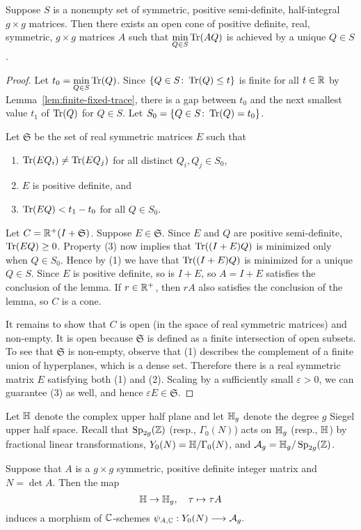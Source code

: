 \documentclass{amsart}
\begin{document}
\begin{lemma}\label{lem:unique-minimizer}
  Suppose $S$ is a nonempty set of symmetric, positive semi-definite, half-integral $g \times g$ matrices. Then there exists an open cone of positive definite, real, symmetric, $g \times g$ matrices $A$ such that $\displaystyle\min_{Q \in S}\operatorname{Tr}(AQ)$ is achieved by a unique $Q\in S$.
\end{lemma}
\begin{proof}
Let $t_0 = \displaystyle\min_{Q \in S}\operatorname{Tr}(Q)$.
  Since $\{Q \in S \colon \operatorname{Tr}(Q) \leq t\}$ is finite for all $t \in \mathbb{R}$ by Lemma~\ref{lem:finite-fixed-trace},
  there is a gap between $t_0$ and the next smallest value $t_1$ of $\operatorname{Tr}(Q)$ for $Q \in S$. Let $S_0 = \{Q \in S \colon \operatorname{Tr}(Q) = t_0\}$.

  Let $\mathfrak{S}$ be the set of real symmetric matrices $E$ such that
  \begin{enumerate}
    \item $\operatorname{Tr}(EQ_i) \neq \operatorname{Tr}(EQ_j)$ for all distinct $Q_i,Q_j \in S_0$,
    \item $E$ is positive definite, and
    \item $\operatorname{Tr}(EQ) < t_1 - t_0$ for all $Q\in S_0$.
  \end{enumerate}
  Let $C = \mathbb{R}^+(I + \mathfrak{S})$.
  Suppose $E\in\mathfrak{S}$. Since $E$ and $Q$ are positive semi-definite, $\operatorname{Tr}(EQ)\ge 0$. Property (3) now implies that $\operatorname{Tr}((I+E)Q)$ is minimized only when $Q \in S_0$. Hence by (1) we have that $\operatorname{Tr}((I+E)Q)$ is minimized for a unique $Q \in S$. Since $E$ is positive definite, so is $I+E$, so $A = I + E$ satisfies the conclusion of the lemma. If $r \in \mathbb{R}^+$, then $rA$ also satisfies the conclusion of the lemma,  so $C$ is a cone.

  It remains to show that $C$ is open (in the space of real symmetric matrices) and non-empty. It is open because $\mathfrak{S}$ is defined as a finite intersection of open subsets. To see that $\mathfrak{S}$ is non-empty, observe that (1) describes the complement of a finite union of hyperplanes, which is a dense set. Therefore there is a real symmetric matrix $E$ satisfying both (1) and (2). Scaling by a sufficiently small $\varepsilon > 0$, we can guarantee (3) as well, and hence $\varepsilon E \in \mathfrak{S}$.
\end{proof}

Let $\mathbb{H}$ denote the complex upper half plane and let $\mathbb{H}_g$ denote the degree $g$ Siegel upper half space. Recall that $\operatorname{Sp}_{2g}(\mathbb{Z})$ (resp., $\Gamma_0(N)$) acts on $\mathbb{H}_g$ (resp., $\mathbb{H}$) by fractional linear transformations,
 $Y_0(N) = \mathbb{H}/\Gamma_0(N)$, and $\mathcal{A}_g = \mathbb{H}_g/\operatorname{Sp}_{2g}(\mathbb{Z})$.
\begin{lemma}\label{lem:psi-A-n}
Suppose that $A$ is a $g \times g$ symmetric, positive definite integer matrix and $N = \det A$.
Then the map \[
  \mathbb{H} \to \mathbb{H}_g, \quad  \tau \mapsto \tau A
\]
induces a morphism of $\mathbb{C}$-schemes
$
  {\psi}_{A, \mathbb{C}}: Y_0(N) \longrightarrow \mathcal{A}_g.
$
\end{lemma}
\end{document}
